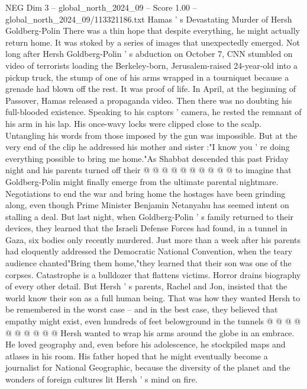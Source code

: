 \begin{textsample}{NEG Dim 3 – global\_north\_2024\_09 – Score 1.00 – global\_north\_2024\_09/113321186.txt}  \label{ex:f3_neg_296}
Hamas ' s Devastating Murder of Hersh Goldberg-Polin There was a thin hope that despite everything, he might actually return home.
It was stoked by a series of images that unexpectedly emerged.
Not long after Hersh Goldberg-Polin ' s abduction on October 7, CNN stumbled on video of terrorists loading the Berkeley-born, Jerusalem-raised 24-year-old into a pickup truck, the stump of one of his arms wrapped in a tourniquet because a grenade had blown off the rest.
It was proof of life.
In April, at the beginning of Passover, Hamas released a propaganda video.
Then there was no doubting his full-blooded existence.
Speaking to his captors ' camera, he rested the remnant of his arm in his lap.
His once-wavy locks were clipped close to the scalp.
Untangling his words from those imposed by the gun was impossible.
But at the very end of the clip he addressed his mother and sister :"I know you ' re doing everything possible to bring me home."As Shabbat descended this past Friday night and his parents turned off their @ @ @ @ @ @ @ @ @ @ to imagine that Goldberg-Polin might finally emerge from the ultimate parental nightmare.
Negotiations to end the war and bring home the hostages have been grinding along, even though Prime Minister Benjamin Netanyahu has seemed intent on stalling a deal.
But last night, when Goldberg-Polin ' s family returned to their devices, they learned that the Israeli Defense Forces had found, in a tunnel in Gaza, six bodies only recently murdered.
Just more than a week after his parents had eloquently addressed the Democratic National Convention, when the teary audience chanted"Bring them home,"they learned that their son was one of the corpses.
Catastrophe is a bulldozer that flattens victims.
Horror drains biography of every other detail.
But Hersh ' s parents, Rachel and Jon, insisted that the world know their son as a full human being.
That was how they wanted Hersh to be remembered in the worst case -- and in the best case, they believed that empathy might exist, even hundreds of feet belowground in the tunnels @ @ @ @ @ @ @ @ @ @ Hersh wanted to wrap his arms around the globe in an embrace.
He loved geography and, even before his adolescence, he stockpiled maps and atlases in his room.
His father hoped that he might eventually become a journalist for National Geographic, because the diversity of the planet and the wonders of foreign cultures lit Hersh ' s mind on fire.

\end{textsample}
